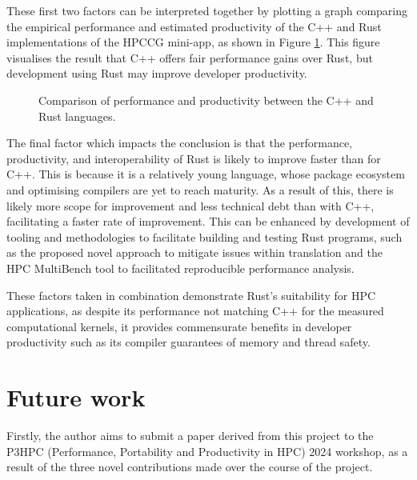 These first two factors can be interpreted together by plotting a graph comparing the empirical performance and estimated productivity of the C++ and Rust implementations of the HPCCG \acrshort{mini-app}, as shown in Figure \ref{fig:conclusions_performance_productivity}. This figure visualises the result that C++ offers fair performance gains over Rust, but development using Rust may improve developer productivity.

\begin{figure}[H]
    \centering
    
    \caption{Comparison of performance and productivity between the C++ and Rust languages.}
    \label{fig:conclusions_performance_productivity}
\end{figure}

The final factor which impacts the conclusion is that the performance, productivity, and interoperability of Rust is likely to improve faster than for C++. This is because it is a relatively young language, whose package ecosystem and optimising compilers are yet to reach maturity. As a result of this, there is likely more scope for improvement and less technical debt than with C++, facilitating a faster rate of improvement.
This can be enhanced by development of tooling and methodologies to facilitate building and testing Rust programs, such as the proposed novel approach to mitigate issues within translation and the HPC MultiBench tool to facilitated reproducible performance analysis.

These factors taken in combination demonstrate Rust's suitability for \acrshort{HPC} applications, as despite its performance not matching C++ for the measured computational kernels, it provides commensurate benefits in developer productivity such as its compiler guarantees of memory and thread safety.


\section{Future work}
\label{sec:future-work}

Firstly, the author aims to submit a paper derived from this project to the P3HPC (Performance, Portability and Productivity in \acrshort{HPC}) 2024 workshop, as a result of the three novel contributions made over the course of the project.

